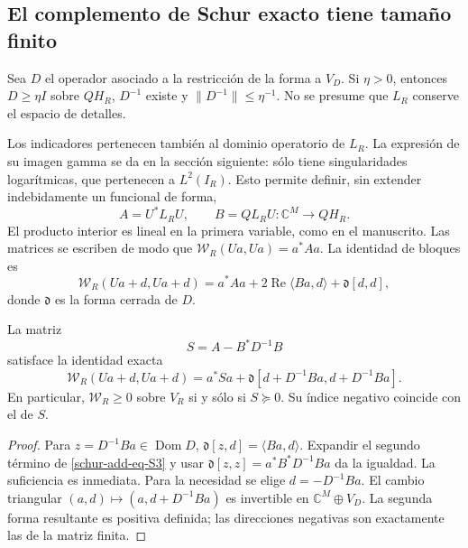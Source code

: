 \subsection{El complemento de Schur exacto tiene tamaño finito}
\label{schur-add-sub-97}

Sea \(D\) el operador asociado a la restricción de la forma a \(V_D\).
Si \(\eta>0\), entonces \(D\geq\eta I\) sobre \(QH_R\),
\(D^{-1}\) existe y \(\|D^{-1}\|\leq\eta^{-1}\).
No se presume que \(L_R\) conserve el espacio de detalles.

Los indicadores pertenecen también al dominio operatorio de \(L_R\).
La expresión de su imagen gamma se da en la sección siguiente: sólo
tiene singularidades logarítmicas, que pertenecen a \(L^2(I_R)\).
Esto permite definir, sin extender indebidamente un funcional de forma,
\begin{equation}
A=U^*L_RU,\qquad B=QL_RU:\mathbb C^M\longrightarrow QH_R.
\label{schur-add-display-6}
\end{equation}
El producto interior es lineal en la primera variable, como en el
manuscrito. Las matrices se escriben de modo que
\(\mathscr W_R(Ua,Ua)=a^*Aa\). La identidad de bloques es
\begin{equation}
\mathscr W_R(Ua+d,Ua+d)
=a^*Aa+2\operatorname{Re}\langle Ba,d\rangle
+\mathfrak d[d,d],
\label{schur-add-display-7}
\end{equation}
donde \(\mathfrak d\) es la forma cerrada de \(D\).

\begin{theorem}
\label{schur-add-schur-exacto}
La matriz
\begin{equation}
S=A-B^*D^{-1}B
\label{schur-add-eq-S2}
\end{equation}
satisface la identidad exacta
\begin{equation}
\boxed{\mathscr W_R(Ua+d,Ua+d)
=a^*Sa+
\mathfrak d[d+D^{-1}Ba,d+D^{-1}Ba].}
\label{schur-add-eq-S3}
\end{equation}
En particular, \(\mathscr W_R\geq0\) sobre \(V_R\) si y sólo si
\(S\succeq0\). Su índice negativo coincide con el de \(S\).
\end{theorem}
\begin{proof} Para \(z=D^{-1}Ba\in\operatorname{Dom}D\),
\(\mathfrak d[z,d]=\langle Ba,d\rangle\). Expandir el segundo término
de \eqref{schur-add-eq-S3} y usar \(\mathfrak d[z,z]=a^*B^*D^{-1}Ba\) da la igualdad.
La suficiencia es inmediata. Para la necesidad se elige
\(d=-D^{-1}Ba\). El cambio triangular \((a,d)\mapsto(a,d+D^{-1}Ba)\)
es invertible en \(\mathbb C^M\oplus V_D\). La segunda forma resultante
es positiva definida; las direcciones negativas son exactamente las de
la matriz finita.
\end{proof}

